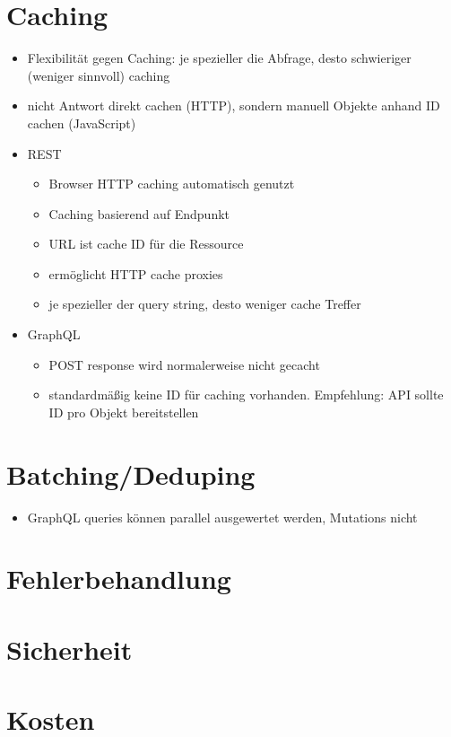 \section{Caching}
\begin{itemize}
  \item Flexibilität gegen Caching: je spezieller die Abfrage, desto schwieriger (weniger sinnvoll) caching
  \item nicht Antwort direkt cachen (HTTP), sondern manuell Objekte anhand ID cachen (JavaScript)
  \item REST
  \begin{itemize}
    \item Browser HTTP caching automatisch genutzt
    \item Caching basierend auf Endpunkt
    \item URL ist cache ID für die Ressource
    \item ermöglicht HTTP cache proxies
    \item je spezieller der query string, desto weniger cache Treffer
  \end{itemize}
  \item GraphQL
  \begin{itemize}
    \item POST response wird normalerweise nicht gecacht
    \item standardmäßig keine ID für caching vorhanden. Empfehlung: API sollte ID pro Objekt bereitstellen
  \end{itemize}
\end{itemize}

\section{Batching/Deduping}
\begin{itemize}
  \item GraphQL queries können parallel ausgewertet werden, Mutations nicht
\end{itemize}

\section{Fehlerbehandlung}

\section{Sicherheit}

\section{Kosten}

